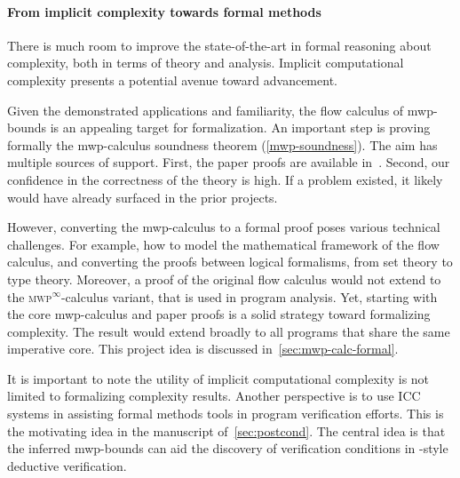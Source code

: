 \paragraph*{From implicit complexity towards formal methods}
There is much room to improve the state-of-the-art in formal reasoning about
complexity, both in terms of theory and analysis. Implicit computational
complexity presents a potential avenue toward advancement.

Given the demonstrated applications and familiarity, the flow calculus of
mwp-bounds is an appealing target for formalization. An
important step is proving formally the mwp-calculus soundness
theorem (\autoref{mwp-soundness}). The aim has
multiple sources of support. First, the paper proofs are available
in~\cite{jones2009}. Second, our confidence in the correctness of the theory is
high. If a problem existed, it likely would have already surfaced in the prior
projects.

However, converting the mwp-calculus to a formal proof poses various technical
challenges. For example, how to model the mathematical framework of the flow
calculus, and converting the proofs between logical formalisms, from set theory
to type theory. Moreover, a proof of the original flow calculus would not extend
to the \textsc{mwp}$^\infty$-calculus variant, that is used in
program analysis. Yet, starting with the core mwp-calculus and paper proofs is a
solid strategy toward formalizing complexity. The result would extend broadly to
all programs that share the same imperative core. This project idea is discussed
in~\autoref{sec:mwp-calc-formal}.

It is important to note the utility of implicit computational complexity is not
limited to formalizing complexity results. Another perspective is to use ICC
systems in assisting formal methods tools in program verification efforts. This
is the motivating idea in the manuscript of~\autoref{sec:postcond}. The central
idea is that the inferred mwp-bounds can aid the discovery of verification
conditions in -style deductive verification.
